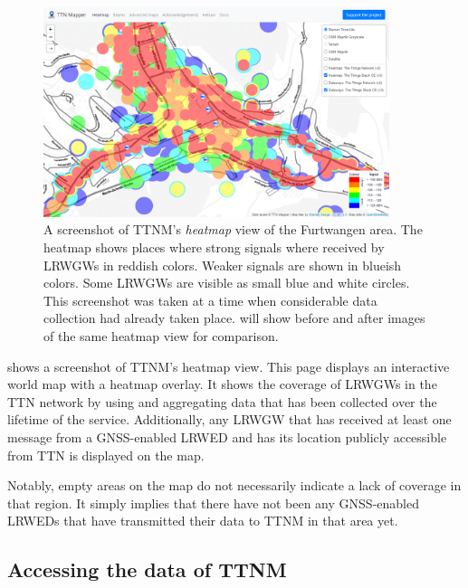 \begin{figure}[htbp]
    \centering
    \includegraphics[width=0.9\textwidth]{pictures/ttn-mapper/heatmap_with_gateways.png}
    \caption[Screenshot of \acl{TTNM}'s heatmap view of the Furtwangen area.]{
        A screenshot of \ac{TTNM}'s \emph{heatmap} view of the Furtwangen area.
        The heatmap shows places where strong signals where received by \aclp{LRWGW} in reddish colors.
        Weaker signals are shown in blueish colors.
        Some \aclp{LRWGW} are visible as small blue and white circles.
        This screenshot was taken at a time when considerable data collection had already taken place.
         will show before and after images of the same heatmap view for comparison.~\protect\cite{ttn_mapper_ttn_2023}
    }\label{pic:ttn-mapper-heatmap-with-gateways}
\end{figure}

 shows a screenshot of \acl{TTNM}'s heatmap view.
This page displays an interactive world map with a heatmap overlay.
It shows the coverage of \aclp{LRWGW} in the \ac{TTN} network by using and aggregating data that has been collected over the lifetime of the service.
Additionally, any \acl{LRWGW} that has received at least one message from a \ac{GNSS}-enabled \acl{LRWED} and has its location publicly accessible from \ac{TTN} is displayed on the map.

Notably, empty areas on the map do not necessarily indicate a lack of coverage in that region.
It simply implies that there have not been any \ac{GNSS}-enabled \aclp{LRWED} that have transmitted their data to \ac{TTNM} in that area yet.

\subsection{Accessing the data of \acl{TTNM}}

